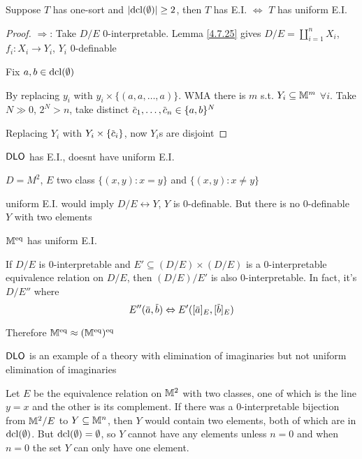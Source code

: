 \documentclass[11pt]{article}
\begin{document}
\begin{theorem}[]
\label{4.7.26}
Suppose \(T\) has one-sort and \(\abs{\dcl(\emptyset)}\ge 2\), then \(T\) has E.I. \(\Leftrightarrow\) \(T\) has uniform E.I.
\end{theorem}

\begin{proof}
\(\Rightarrow\): Take \(D/E\) 0-interpretable. Lemma \ref{4.7.25}
gives \(D/E=\coprod_{i=1}^nX_i\), \(f_i:X_i\to Y_i\), \(Y_i\) 0-definable

Fix \(a,b\in\operatorname{dcl}(\emptyset)\)

By replacing \(y_i\) with \(y_i\times\{(a,a,\dots,a)\}\). WMA there is \(m\) s.t. \(Y_i\subseteq\mathbb{M}^m\) \(\forall i\).
Take \(N\gg 0\), \(2^N>n\), take distinct \(\barc_1,\dots,\barc_n\in\{a,b\}^N\)

Replacing \(Y_i\) with \(Y_i\times\{\barc_i\}\), now \(Y_i\)s are disjoint
\end{proof}

\begin{examplle}[]
\(\operatorname{\textsf{DLO}}\) has E.I., doesnt have uniform E.I.

\(D=M^2\), \(E\) two class \(\{(x,y):x=y\}\) and \(\{(x,y):x\neq y\}\)

uniform E.I. would imply \(D/E\leftrightarrow Y\), \(Y\) is 0-definable. But there is no 0-definable \(Y\)
with two elements
\end{examplle}

\begin{remark}
\(\mathbb{M}^{\operatorname{eq}}\) has uniform E.I.

If \(D/E\) is 0-interpretable and \(E'\subseteq(D/E)\times(D/E)\) is a 0-interpretable equivalence relation
on \(D/E\), then \((D/E)/E'\) is also 0-interpretable. In fact, it's \(D/E''\) where
\begin{equation*}
E''(\bara,\barb)\Leftrightarrow E'([\bara]_E,[\barb]_E)
\end{equation*}

Therefore \(\mathbb{M}^{\operatorname{eq}}\approx(\mathbb{M}^{\operatorname{eq}})^{\operatorname{eq}}\)
\end{remark}

\begin{examplle}[]
\(\operatorname{\textsf{DLO}}\) is an example of a theory with elimination of imaginaries but not uniform elimination
of imaginaries

Let \(E\) be the equivalence relation on \(\mathbb{M}^2\) with two classes, one of which is the
line \(y=x\) and the other is its complement. If there was a 0-interpretable bijection
from \(\mathbb{M}^2/E\) to \(Y\subseteq\mathbb{M}^n\), then \(Y\) would contain two elements, both of which are
in \(\operatorname{dcl}(\emptyset)\). But \(\operatorname{dcl}(\emptyset)=\emptyset\), so \(Y\) cannot have any elements unless \(n=0\) and
when \(n=0\) the set \(Y\) can only have one element.
\end{examplle}
\end{document}
